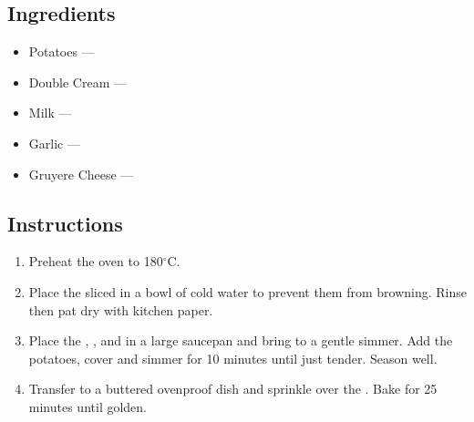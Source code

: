 \documentclass[12pt]{article}%
\begin{document}
\recipetitle

\subsection*{Ingredients}

\begin{itemize}[nolistsep]
    \item Potatoes --- 
    \item Double Cream --- 
    \item Milk --- 
    \item Garlic --- 
    \item Gruyere Cheese --- 
\end{itemize}

\subsection*{Instructions}

\begin{enumerate}
    \item Preheat the oven to 180\(^{\circ}\)C.
    \item Place the sliced  in a bowl of cold water to prevent them from browning. Rinse then pat dry with kitchen paper.
    \item Place the , , and  in a large saucepan and bring to a gentle simmer. Add the potatoes, cover and simmer for 10 minutes until just tender. Season well.
    \item Transfer to a buttered ovenproof dish and sprinkle over the . Bake for 25 minutes until golden.
\end{enumerate}
\end{document}
